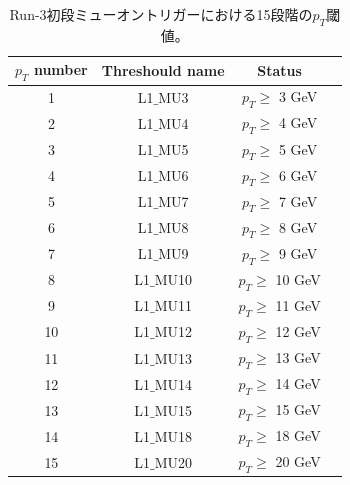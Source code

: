 \begin{table}[]
    \caption{Run-3初段ミューオントリガーにおける15段階の$p_T$閾値\cite{article:shiomi-mron}。}
    \label{pt_number}
    \centering
    \begin{tabular}{|c|c|c|c|}
        \hline
        $p_T$ number & Threshould name & Status\\
        \hline
        1 & L1$\_$MU3 & $p_T \geq$ 3 GeV \\
        \hline
        2 & L1$\_$MU4 & $p_T \geq$ 4 GeV \\
        \hline
        3 & L1$\_$MU5 & $p_T \geq$ 5 GeV \\
        \hline
        4 & L1$\_$MU6 & $p_T \geq$ 6 GeV \\
        \hline
        5 & L1$\_$MU7 & $p_T \geq$ 7 GeV \\
        \hline
        6 & L1$\_$MU8 & $p_T \geq$ 8 GeV \\
        \hline
        7 & L1$\_$MU9 & $p_T \geq$ 9 GeV \\
        \hline
        8 & L1$\_$MU10 & $p_T \geq$ 10 GeV \\
        \hline
        9 & L1$\_$MU11 & $p_T \geq$ 11 GeV \\
        \hline
        10 & L1$\_$MU12 & $p_T \geq$ 12 GeV \\
        \hline
        11 & L1$\_$MU13 & $p_T \geq$ 13 GeV \\
        \hline
        12 & L1$\_$MU14 & $p_T \geq$ 14 GeV \\
        \hline
        13 & L1$\_$MU15 & $p_T \geq$ 15 GeV \\
        \hline
        14 & L1$\_$MU18 & $p_T \geq$ 18 GeV \\
        \hline
        15 & L1$\_$MU20 & $p_T \geq$ 20 GeV \\
        \hline
    \end{tabular}
\end{table}

